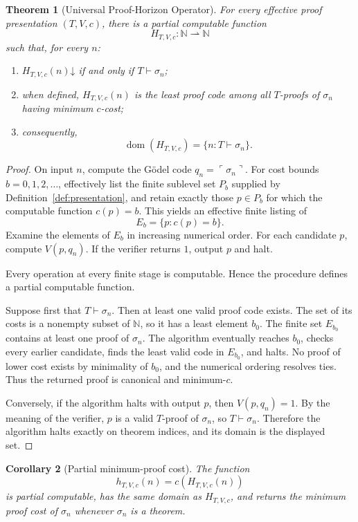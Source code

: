 \documentclass[11pt,oneside]{book}
\newtheorem{theorem}{Theorem}[chapter]
\newtheorem{corollary}[theorem]{Corollary}
\theoremstyle{definition}
\theoremstyle{remark}
\newcommand{\N}{\mathbb{N}}
\newcommand{\code}[1]{\ulcorner #1\urcorner}
\newcommand{\halts}{\mathord{\downarrow}}
\begin{document}
\begin{theorem}[Universal Proof-Horizon Operator]\label{thm:universal}
For every effective proof presentation $(T,V,c)$, there is a partial computable function
\[
H_{T,V,c}:\N\rightharpoonup\N
\]
such that, for every $n$:
\begin{enumerate}[label=(\roman*)]
\item $H_{T,V,c}(n)\halts$ if and only if $T\vdash\sigma_n$;
\item when defined, $H_{T,V,c}(n)$ is the least proof code among all $T$-proofs of $\sigma_n$ having minimum $c$-cost;
\item consequently,
\[
\operatorname{dom}(H_{T,V,c})=\{n:T\vdash\sigma_n\}.
\]
\end{enumerate}
\end{theorem}
\begin{proof}
On input $n$, compute the G\"odel code $q_n=\code{\sigma_n}$. For cost bounds $b=0,1,2,\ldots$, effectively list the finite sublevel set $P_b$ supplied by Definition~\ref{def:presentation}, and retain exactly those $p\in P_b$ for which the computable function $c(p)=b$. This yields an effective finite listing of
\[
E_b=\{p:c(p)=b\}.
\]
Examine the elements of $E_b$ in increasing numerical order. For each candidate $p$, compute $V(p,q_n)$. If the verifier returns $1$, output $p$ and halt.

Every operation at every finite stage is computable. Hence the procedure defines a partial computable function.

Suppose first that $T\vdash\sigma_n$. Then at least one valid proof code exists. The set of its costs is a nonempty subset of $\N$, so it has a least element $b_0$. The finite set $E_{b_0}$ contains at least one proof of $\sigma_n$. The algorithm eventually reaches $b_0$, checks every earlier candidate, finds the least valid code in $E_{b_0}$, and halts. No proof of lower cost exists by minimality of $b_0$, and the numerical ordering resolves ties. Thus the returned proof is canonical and minimum-$c$.

Conversely, if the algorithm halts with output $p$, then $V(p,q_n)=1$. By the meaning of the verifier, $p$ is a valid $T$-proof of $\sigma_n$, so $T\vdash\sigma_n$. Therefore the algorithm halts exactly on theorem indices, and its domain is the displayed set.
\end{proof}

\begin{corollary}[Partial minimum-proof cost]\label{cor:mincost}
The function
\[
h_{T,V,c}(n)=c(H_{T,V,c}(n))
\]
is partial computable, has the same domain as $H_{T,V,c}$, and returns the minimum proof cost of $\sigma_n$ whenever $\sigma_n$ is a theorem.
\end{corollary}
\end{document}

